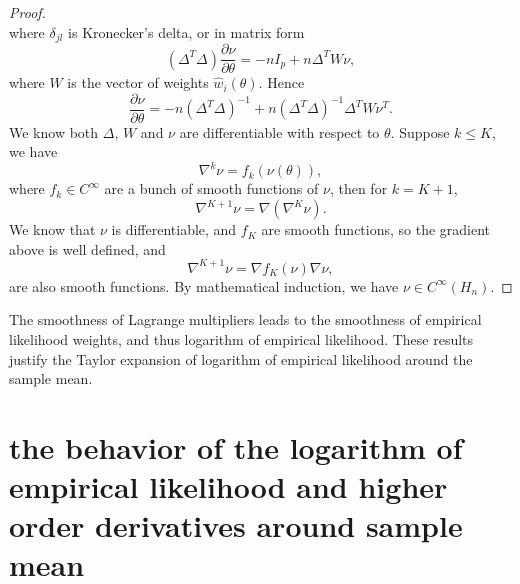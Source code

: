 \documentclass[oneside,english]{amsbook}
\numberwithin{section}{chapter}
\numberwithin{equation}{section}
\numberwithin{figure}{section}
\theoremstyle{plain}
\theoremstyle{plain}
\theoremstyle{definition}
\theoremstyle{plain}
\theoremstyle{plain}
\theoremstyle{remark}
\theoremstyle{definition}
\theoremstyle{definition}
\begin{document}
\begin{proof}
\[\]
where $\delta_{jl}$ is Kronecker's delta, or in matrix form 
\[
\left(\Delta^{T}\Delta\right)\frac{\partial\nu}{\partial\theta}=-nI_{p}+n\Delta^{T}W\nu,
\]
where $W$ is the vector of weights $\hat{w}_{i}\left(\theta\right)$.
Hence 
\[
\frac{\partial\nu}{\partial\theta}=-n\left(\Delta^{T}\Delta\right)^{-1}+n\left(\Delta^{T}\Delta\right)^{-1}\Delta^{T}W\nu^{T}.
\]
We know both $\Delta$, $W$ and $\nu$ are differentiable with respect
to $\theta$. Suppose $k\le K$, we have 
\[
\nabla^{k}\nu=f_{k}\left(\nu\left(\theta\right)\right),
\]
where $f_{k}\in C^{\infty}$ are a bunch of smooth functions of $\nu$,
then for $k=K+1$, 
\[
\nabla^{K+1}\nu=\nabla\left(\nabla^{K}\nu\right).
\]
We know that $\nu$ is differentiable, and $f_{K}$ are smooth functions,
so the gradient above is well defined, and 
\[
\nabla^{K+1}\nu=\nabla f_{K}\left(\nu\right)\nabla\nu,
\]
are also smooth functions. By mathematical induction, we have $\nu\in C^{\infty}\left(H_{n}\right)$. 
\end{proof}
The smoothness of Lagrange multipliers leads to the smoothness of
empirical likelihood weights, and thus logarithm of empirical likelihood.
These results justify the Taylor expansion of logarithm of empirical
likelihood around the sample mean. 


\section{the behavior of the logarithm of empirical likelihood and higher
order derivatives around sample mean}
\end{document}
